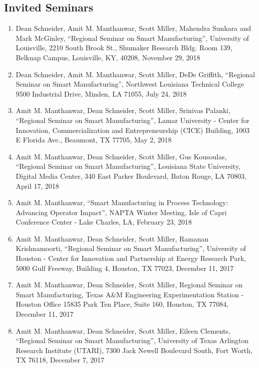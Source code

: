 \documentclass[10pt]{article}
\begin{document}
\subsection{Invited Seminars}
\begin{enumerate}[nosep]
\item Dean Schneider, Amit M. Manthanwar, Scott Miller, Mahendra Sunkara and Mark McGinley, ``Regional Seminar on Smart Manufacturing'', University of Louisville, 2210 South Brook St., Shumaker Research Bldg. Room 139, Belknap Campus, Louisville, KY, 40208, November 29, 2018

\item Dean Schneider, Amit M. Manthanwar, Scott Miller, DeDe Griffith, ``Regional Seminar on Smart Manufacturing'', Northwest Louisiana Technical College
9500 Industrial Drive, Minden, LA 71055, July 24, 2018

\item Amit M. Manthanwar, Dean Schneider, Scott Miller, Srinivas Palanki, ``Regional Seminar on Smart Manufacturing'', Lamar University - Center for Innovation, Commercialization and Entrepreneurship (CICE) Building, 1003 E Florida Ave., Beaumont, TX 77705, May 2, 2018

\item Amit M. Manthanwar, Dean Schneider, Scott Miller, Gus Kousoulas, ``Regional Seminar on Smart Manufacturing'', Louisiana State University, Digital Media Center, 340 East Parker Boulevard, Baton Rouge, LA 70803, April 17, 2018

\item Amit M. Manthanwar, ``Smart Manufacturing in Process Technology: Advancing Operator Impact'', NAPTA Winter Meeting, Isle of Capri Conference Center - Lake Charles, LA, February 23, 2018

\item Amit M. Manthanwar, Dean Schneider, Scott Miller, Ramanan Krishnamoorti, ``Regional Seminar on Smart Manufacturing'', University of Houston - Center for Innovation and Partnership at Energy Research Park, 5000 Gulf Freeway, Building 4, Houston, TX 77023, December 11, 2017

\item Amit M. Manthanwar, Dean Schneider, Scott Miller, Regional Seminar on Smart Manufacturing, Texas A\&M Engineering Experimentation Station - Houston Office
15835 Park Ten Place, Suite 160, Houston, TX 77084, December 11, 2017

\item Amit M. Manthanwar, Dean Schneider, Scott Miller, Eileen Clements, ``Regional Seminar on Smart Manufacturing'',  University of Texas Arlington Research Institute (UTARI), 7300 Jack Newell Boulevard South, Fort Worth, TX 76118, December 7, 2017


\end{enumerate}
\end{document}
